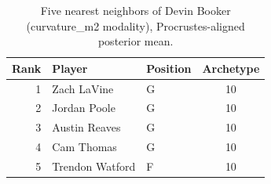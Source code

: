 \begin{table}[htbp]
  \centering\small
  \begin{tabular}{rllc}
    \toprule
    Rank & Player & Position & Archetype \\
    \midrule
    1 & Zach LaVine & G & 10 \\
    2 & Jordan Poole & G & 10 \\
    3 & Austin Reaves & G & 10 \\
    4 & Cam Thomas & G & 10 \\
    5 & Trendon Watford & F & 10 \\
    \bottomrule
  \end{tabular}
  \caption{Five nearest neighbors of Devin Booker (curvature_m2 modality), Procrustes-aligned posterior mean.}
  \label{tab:Devin_Booker_neighbors_curvature_m2}
\end{table}

